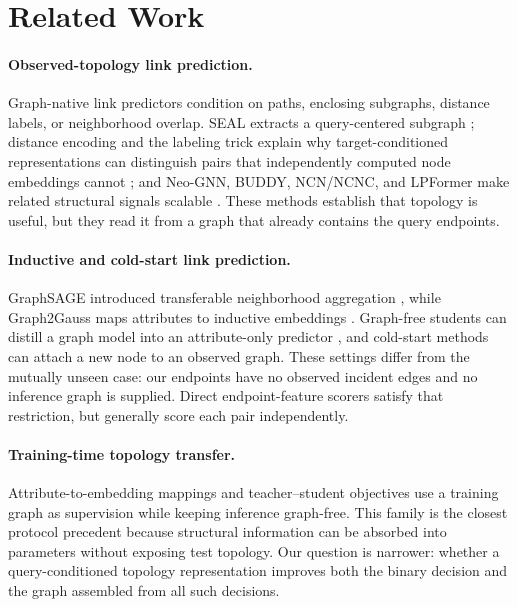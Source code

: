 \section{Related Work}
\label{sec:related}

\paragraph{Observed-topology link prediction.}
Graph-native link predictors condition on paths, enclosing subgraphs, distance
labels, or neighborhood overlap. SEAL extracts a query-centered subgraph
\citep{zhang2018seal}; distance encoding and the labeling trick explain why
target-conditioned representations can distinguish pairs that independently
computed node embeddings cannot \citep{li2020distance,zhang2021labeling}; and
Neo-GNN, BUDDY, NCN/NCNC, and LPFormer make related structural signals scalable
\citep{yun2021neognn,chamberlain2023buddy,wang2024ncn,shomer2024lpformer}.
These methods establish that topology is useful, but they read it from a graph
that already contains the query endpoints.

\paragraph{Inductive and cold-start link prediction.}
GraphSAGE introduced transferable neighborhood aggregation
\citep{hamilton2017graphsage}, while Graph2Gauss maps attributes to inductive
embeddings \citep{bojchevski2018graph2gauss}. Graph-free students can distill a
graph model into an attribute-only predictor
\citep{zhang2022glnn,zheng2022coldbrew}, and cold-start methods can attach a new
node to an observed graph. These settings differ from the mutually unseen case:
our endpoints have no observed incident edges and no inference graph is supplied.
Direct endpoint-feature scorers satisfy that restriction, but generally score
each pair independently.

\paragraph{Training-time topology transfer.}
Attribute-to-embedding mappings and teacher--student objectives use a training
graph as supervision while keeping inference graph-free. This family is the
closest protocol precedent because structural information can be absorbed into
parameters without exposing test topology. Our question is narrower: whether a
query-conditioned topology representation improves both the binary decision and
the graph assembled from all such decisions.

